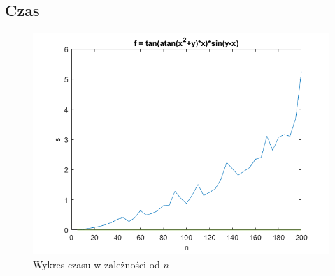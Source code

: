 \documentclass[12pt, leqno]{article}
\begin{document}
        \newpage
        \subsection*{Czas}
        \begin{figure}[!h]
            \includegraphics[width=\linewidth]{graph1.png}
            \caption{Wykres czasu w zależności od $n$}
        \end{figure}

        \newpage
\end{document}
